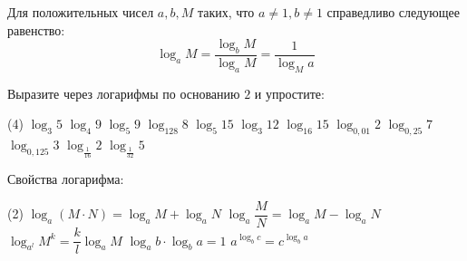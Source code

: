 \begin{class}[number=2]
	\begin{definit}
		Для положительных чисел \( a, b, M \) таких, что \( a \neq 1, b \neq 1 \) справедливо следующее равенство: \[ \log_a M = \dfrac{\log_b M}{\log_a M} = \dfrac{1}{\log_M a} \]
	\end{definit}
	\begin{listofex}
		\item Выразите через логарифмы по основанию \(2\) и упростите:
		\begin{tasks}(4)
			\task \( \log_3 5 \)
			\task \( \log_4 9 \)
			\task \( \log_5 9 \)
			\task \( \log_{128} 8 \)
			\task \( \log_5 15 \)
			\task \( \log_3 12 \)
			\task \( \log_{16} 15 \)
			\task \( \log_{0,01} 2 \)
			\task \( \log_{0,25} 7 \)
			\task \( \log_{0,125} 3 \)
			\task \( \log_{\frac{1}{16}} 2 \)
			\task \( \log_{\frac{1}{32}} 5 \)
		\end{tasks}
	\end{listofex}
	\begin{definit}
		Свойства логарифма:
		\begin{tasks}(2)
			\task \( \log_a(M \cdot N) = \log_a M + \log_a N \)
			\task \( \log_a \dfrac{M}{N} = \log_a M - \log_a N \)
			\task \( \log_{a^l} M^k=\dfrac{k}{l}\log_a M \)
			\task \( \log_a b \cdot \log_b a = 1 \)
			\task \( a^{\log_b c}=c^{\log_b a} \)
		\end{tasks}
		

\end{definit}
\end{class}
